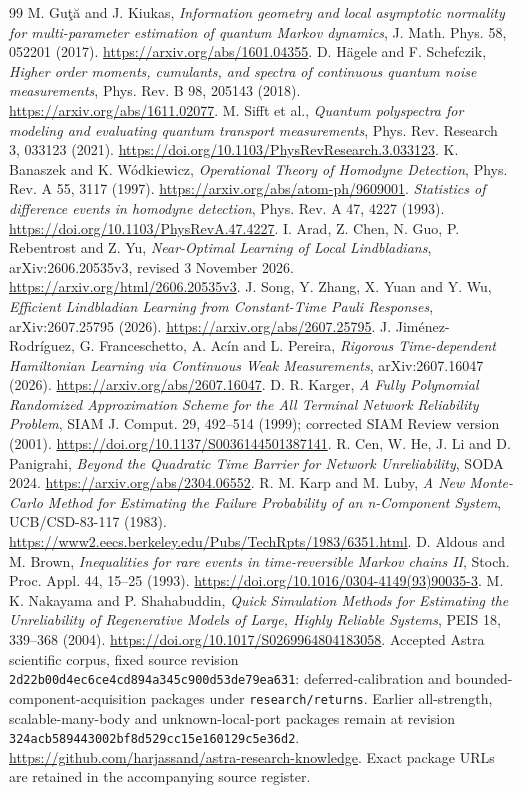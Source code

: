 \documentclass[11pt]{article}
\begin{document}
\begin{thebibliography}{99}\small
{} M. Gu\c{t}\u{a} and J. Kiukas, \emph{Information geometry and local asymptotic normality for multi-parameter estimation of quantum Markov dynamics}, J. Math. Phys. 58, 052201 (2017). \url{https://arxiv.org/abs/1601.04355}.
 D. H\"agele and F. Schefczik, \emph{Higher order moments, cumulants, and spectra of continuous quantum noise measurements}, Phys. Rev. B 98, 205143 (2018). \url{https://arxiv.org/abs/1611.02077}.
 M. Sifft et al., \emph{Quantum polyspectra for modeling and evaluating quantum transport measurements}, Phys. Rev. Research 3, 033123 (2021). \url{https://doi.org/10.1103/PhysRevResearch.3.033123}.
 K. Banaszek and K. W\'odkiewicz, \emph{Operational Theory of Homodyne Detection}, Phys. Rev. A 55, 3117 (1997). \url{https://arxiv.org/abs/atom-ph/9609001}.
 \emph{Statistics of difference events in homodyne detection}, Phys. Rev. A 47, 4227 (1993). \url{https://doi.org/10.1103/PhysRevA.47.4227}.
 I. Arad, Z. Chen, N. Guo, P. Rebentrost and Z. Yu, \emph{Near-Optimal Learning of Local Lindbladians}, arXiv:2606.20535v3, revised 3 November 2026. \url{https://arxiv.org/html/2606.20535v3}.
 J. Song, Y. Zhang, X. Yuan and Y. Wu, \emph{Efficient Lindbladian Learning from Constant-Time Pauli Responses}, arXiv:2607.25795 (2026). \url{https://arxiv.org/abs/2607.25795}.
 J. Jim\'enez-Rodr\'iguez, G. Franceschetto, A. Ac\'in and L. Pereira, \emph{Rigorous Time-dependent Hamiltonian Learning via Continuous Weak Measurements}, arXiv:2607.16047 (2026). \url{https://arxiv.org/abs/2607.16047}.
 D. R. Karger, \emph{A Fully Polynomial Randomized Approximation Scheme for the All Terminal Network Reliability Problem}, SIAM J. Comput. 29, 492--514 (1999); corrected SIAM Review version (2001). \url{https://doi.org/10.1137/S0036144501387141}.
 R. Cen, W. He, J. Li and D. Panigrahi, \emph{Beyond the Quadratic Time Barrier for Network Unreliability}, SODA 2024. \url{https://arxiv.org/abs/2304.06552}.
 R. M. Karp and M. Luby, \emph{A New Monte-Carlo Method for Estimating the Failure Probability of an n-Component System}, UCB/CSD-83-117 (1983). \url{https://www2.eecs.berkeley.edu/Pubs/TechRpts/1983/6351.html}.
 D. Aldous and M. Brown, \emph{Inequalities for rare events in time-reversible Markov chains II}, Stoch. Proc. Appl. 44, 15--25 (1993). \url{https://doi.org/10.1016/0304-4149(93)90035-3}.
 M. K. Nakayama and P. Shahabuddin, \emph{Quick Simulation Methods for Estimating the Unreliability of Regenerative Models of Large, Highly Reliable Systems}, PEIS 18, 339--368 (2004). \url{https://doi.org/10.1017/S0269964804183058}.
 Accepted Astra scientific corpus, fixed source revision \texttt{2d22b00d4ec6ce4cd894a345c900d53de79ea631}: deferred-calibration and bounded-component-acquisition packages under \texttt{research/returns}. Earlier all-strength, scalable-many-body and unknown-local-port packages remain at revision \texttt{324acb589443002bf8d529cc15e160129c5e36d2}. \url{https://github.com/harjassand/astra-research-knowledge}. Exact package URLs are retained in the accompanying source register.
\end{thebibliography}
\end{document}
